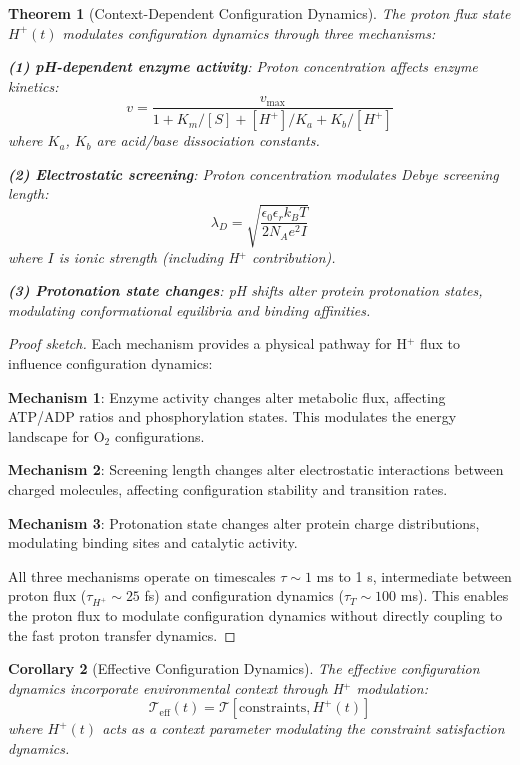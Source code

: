 \documentclass[aps,prd,twocolumn,superscriptaddress,floatfix,nofootinbib]{revtex4-2}
\newtheorem{theorem}{Theorem}[section]
\newtheorem{corollary}[theorem]{Corollary}
\theoremstyle{remark}
\begin{document}
\begin{theorem}[Context-Dependent Configuration Dynamics]
\label{thm:context_modulation}
The proton flux state $H^+(t)$ modulates configuration dynamics through three mechanisms:

\textbf{(1) pH-dependent enzyme activity}: Proton concentration affects enzyme kinetics:
$$
v = \frac{v_{\text{max}}}{1 + K_m / [S] + [H^+] / K_a + K_b / [H^+]}
$$
where $K_a$, $K_b$ are acid/base dissociation constants.

\textbf{(2) Electrostatic screening}: Proton concentration modulates Debye screening length:
$$
\lambda_D = \sqrt{\frac{\epsilon_0 \epsilon_r k_B T}{2 N_A e^2 I}}
$$
where $I$ is ionic strength (including H$^+$ contribution).

\textbf{(3) Protonation state changes}: pH shifts alter protein protonation states, modulating conformational equilibria and binding affinities.
\end{theorem}

\begin{proof}[Proof sketch]
Each mechanism provides a physical pathway for H$^+$ flux to influence configuration dynamics:

\textbf{Mechanism 1}: Enzyme activity changes alter metabolic flux, affecting ATP/ADP ratios and phosphorylation states. This modulates the energy landscape for O$_2$ configurations.

\textbf{Mechanism 2}: Screening length changes alter electrostatic interactions between charged molecules, affecting configuration stability and transition rates.

\textbf{Mechanism 3}: Protonation state changes alter protein charge distributions, modulating binding sites and catalytic activity.

All three mechanisms operate on timescales $\tau \sim 1$ ms to 1 s, intermediate between proton flux ($\tau_{H^+} \sim 25$ fs) and configuration dynamics ($\tau_T \sim 100$ ms). This enables the proton flux to modulate configuration dynamics without directly coupling to the fast proton transfer dynamics.
\end{proof}

\begin{corollary}[Effective Configuration Dynamics]
\label{cor:context}
The effective configuration dynamics incorporate environmental context through H$^+$ modulation:
\begin{equation}
\mathcal{T}_{\text{eff}}(t) = \mathcal{T}[\text{constraints}, H^+(t)]
\end{equation}
where $H^+(t)$ acts as a context parameter modulating the constraint satisfaction dynamics.
\end{corollary}
\end{document}

